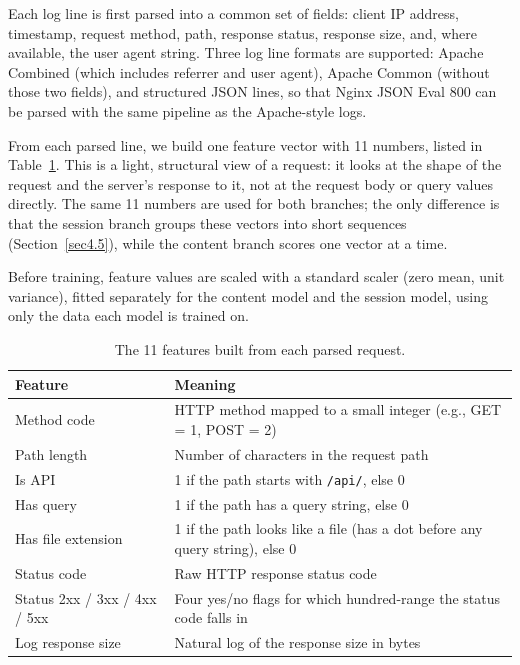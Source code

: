 \documentclass[futureinternet,article,submit,moreauthors]{Definitions/mdpi}
\begin{document}
Each log line is first parsed into a common set of fields: client IP address, timestamp, request method, path, response status, response size, and, where available, the user agent string. Three log line formats are supported: Apache Combined (which includes referrer and user agent), Apache Common (without those two fields), and structured JSON lines, so that Nginx JSON Eval 800 can be parsed with the same pipeline as the Apache-style logs.

From each parsed line, we build one feature vector with 11 numbers, listed in Table~\ref{tab:features}. This is a light, structural view of a request: it looks at the shape of the request and the server's response to it, not at the request body or query values directly. The same 11 numbers are used for both branches; the only difference is that the session branch groups these vectors into short sequences (Section~\ref{sec4.5}), while the content branch scores one vector at a time.

Before training, feature values are scaled with a standard scaler (zero mean, unit variance), fitted separately for the content model and the session model, using only the data each model is trained on.

\begin{table}[H]
\caption{The 11 features built from each parsed request.}
\label{tab:features}
\begin{tabularx}{\textwidth}{lX}
\toprule
\textbf{Feature} & \textbf{Meaning} \\
\midrule
Method code & HTTP method mapped to a small integer (e.g., GET = 1, POST = 2) \\
Path length & Number of characters in the request path \\
Is API & 1 if the path starts with \texttt{/api/}, else 0 \\
Has query & 1 if the path has a query string, else 0 \\
Has file extension & 1 if the path looks like a file (has a dot before any query string), else 0 \\
Status code & Raw HTTP response status code \\
Status 2xx / 3xx / 4xx / 5xx & Four yes/no flags for which hundred-range the status code falls in \\
Log response size & Natural log of the response size in bytes \\
\bottomrule
\end{tabularx}
\end{table}
\end{document}
